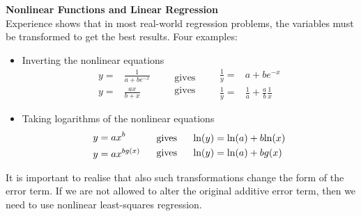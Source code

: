 \textbf{Nonlinear Functions and Linear Regression}\\
Experience shows that in most real-world regression problems, the variables must be transformed to get the best results. Four examples:
\begin{itemize}
  \item Inverting the nonlinear equations
  \begin{equation}
    \begin{split}
      y =& \frac{1}{a+be^{-x}}\\
      y =& \frac{ax}{b+x}
    \end{split}
    \;\;\;\;\;\;
    \begin{split}
      \text{gives}\\
      \text{gives}
    \end{split}
    \;\;\;\;\;\;
    \begin{split}
      \frac{1}{y} =& a + be^{-x}\\
      \frac{1}{y} =& \frac{1}{a} + \frac{a}{b} \frac{1}{x}
    \end{split}
  \end{equation}
  \item Taking logarithms of the nonlinear equations
  \begin{equation}
    \begin{split}
        y &= ax^b\\
        y &= ax^{bg(x)}
    \end{split}
    \;\;\;\;\;\;
    \begin{split}
      \text{gives}\\
      \text{gives}
    \end{split}
    \;\;\;\;\;\;
    \begin{split}
      \textup{ln}(y) &= \textup{ln}(a) + b\textup{ln}(x)\\
      \textup{ln}(y) &= \textup{ln}(a) + bg(x)
    \end{split}
  \end{equation}
\end{itemize}
It is important to realise that also such transformations change the form of the error term. If we are not allowed to alter the original additive error term, then we need to use nonlinear least-squares regression.\\

